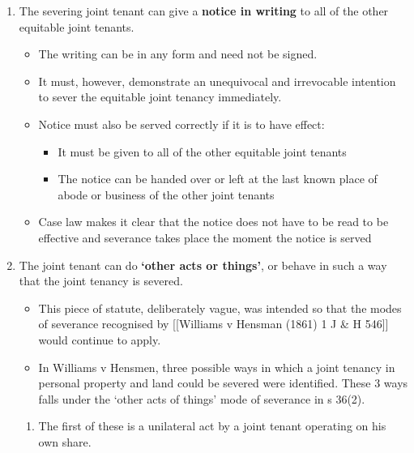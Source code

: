 \documentclass[
]{article}
\providecommand{\tightlist}{%
  \setlength{\itemsep}{0pt}\setlength{\parskip}{0pt}}
\begin{document}
\begin{enumerate}
\def\labelenumi{\arabic{enumi}.}
\tightlist
\item
  The severing joint tenant can give a \textbf{notice in writing} to all
  of the other equitable joint tenants.

  \begin{itemize}
  \tightlist
  \item
    The writing can be in any form and need not be signed.
  \item
    It must, however, demonstrate an unequivocal and irrevocable
    intention to sever the equitable joint tenancy immediately.
  \item
    Notice must also be served correctly if it is to have effect:

    \begin{itemize}
    \tightlist
    \item
      It must be given to all of the other equitable joint tenants
    \item
      The notice can be handed over or left at the last known place of
      abode or business of the other joint tenants
    \end{itemize}
  \item
    Case law makes it clear that the notice does not have to be read to
    be effective and severance takes place the moment the notice is
    served
  \end{itemize}
\item
  The joint tenant can do \textbf{`other acts or things'}, or behave in
  such a way that the joint tenancy is severed.

  \begin{itemize}
  \tightlist
  \item
    This piece of statute, deliberately vague, was intended so that the
    modes of severance recognised by {[}{[}Williams v Hensman (1861) 1 J
    \& H 546{]}{]} would continue to apply.
  \item
    In Williams v Hensmen, three possible ways in which a joint tenancy
    in personal property and land could be severed were identified.
    These 3 ways falls under the `other acts of things' mode of
    severance in s 36(2).
  \end{itemize}

  \begin{enumerate}
  \def\labelenumii{\arabic{enumii}.}
  \tightlist
  \item
    The first of these is a unilateral act by a joint tenant operating
    on his own share.


\end{enumerate}
\end{enumerate}
\end{document}
